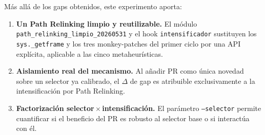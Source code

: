Más allá de los gaps obtenidos, este experimento aporta:
\begin{enumerate}
\item \textbf{Un Path Relinking limpio y reutilizable.} El módulo
  \texttt{path\_relinking\_limpio\_20260531} y el hook \texttt{intensificador}
  sustituyen los \texttt{sys.\_getframe} y los tres monkey-patches del primer
  ciclo por una API explícita, aplicable a las cinco metaheurísticas.
\item \textbf{Aislamiento real del mecanismo.} Al añadir PR como única novedad
  sobre un selector ya calibrado, el $\Delta$ de gap es atribuible
  exclusivamente a la intensificación por Path Relinking.
\item \textbf{Factorización selector\,$\times$\,intensificación.} El parámetro
  \texttt{--selector} permite cuantificar si el beneficio del PR es robusto al
  selector base o si interactúa con él.
\end{enumerate}
